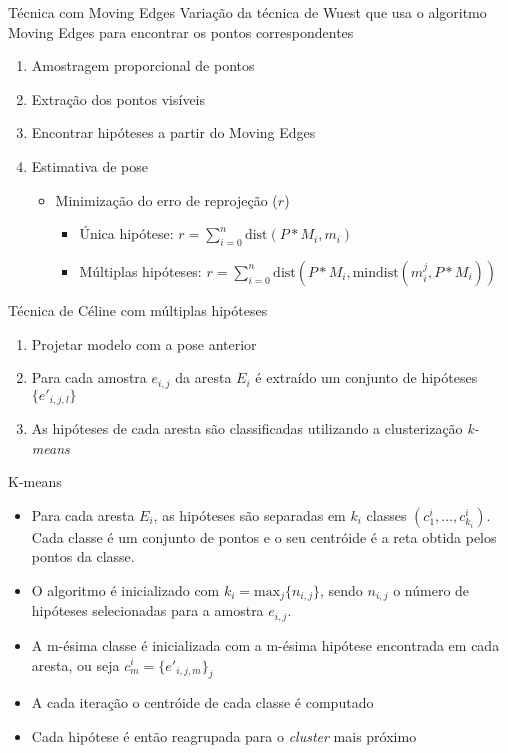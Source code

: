 \documentclass{beamer}
\begin{document}
\begin{frame}{Técnica com Moving Edges}
    Variação da técnica de Wuest que usa o algoritmo Moving Edges para encontrar os pontos correspondentes
    \begin{enumerate}
        \item Amostragem proporcional de pontos
        \item Extração dos pontos visíveis
        \item Encontrar hipóteses a partir do Moving Edges
        \item Estimativa de pose
            \begin{itemize}
                \item Minimização do erro de reprojeção ($r$)
                    \begin{itemize}
                        \item Única hipótese: $r = \sum^n_{i=0}{\textrm{dist}(P \ast M_i, m_i)}$
                        \item Múltiplas hipóteses: $r = \sum^n_{i=0}{\textrm{dist}(P \ast M_i, \textrm{mindist}(m^j_i, P \ast M_i))}$
                    \end{itemize}
            \end{itemize}
    \end{enumerate}
\end{frame}

\begin{frame}{Técnica de Céline com múltiplas hipóteses}
    \begin{enumerate}
        \item Projetar modelo com a pose anterior
        \item Para cada amostra $e_{i,j}$ da aresta $E_i$ é extraído um conjunto de hipóteses $\{e'_{i,j,l}\}$
        \item As hipóteses de cada aresta são classificadas utilizando a clusterização \emph{k-means}
    \end{enumerate}
\end{frame}

\begin{frame}{K-means}
    \begin{itemize}
        \item Para cada aresta $E_i$, as hipóteses são separadas em $k_i$ classes $(c^i_1, \dots , c^i_{k_i})$. Cada classe é um conjunto de pontos e o seu centróide é a reta obtida pelos pontos da classe.
        \item O algoritmo é inicializado com $k_i = \textrm{max}_j\{n_{i,j}\}$, sendo $n_{i,j}$ o número de hipóteses selecionadas para a amostra $e_{i,j}$.
        \item A m-ésima classe é inicializada com a m-ésima hipótese encontrada em cada aresta, ou seja $c^i_m = \{e'_{i,j,m}\}_j$
        \item A cada iteração o centróide de cada classe é computado
        \item Cada hipótese é então reagrupada para o \emph{cluster} mais próximo
    \end{itemize}
\end{frame}
\end{document}
